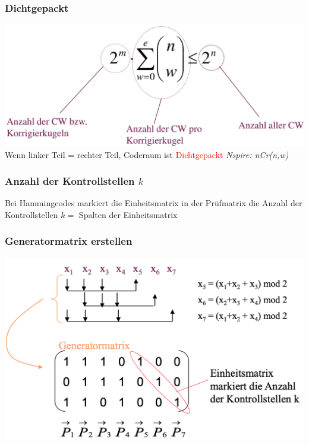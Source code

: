 \subsubsection{Dichtgepackt}
\includegraphics[width=\linewidth]{graphic/extern-reto/Dichtgepackt.png}\\
Wenn linker Teil = rechter Teil, Coderaum ist \textcolor{red}{Dichtgepackt}
\textit{Nspire: nCr(n,w)}

\subsubsection{Anzahl der Kontrollstellen $k$}
Bei Hammingcodes markiert die Einheitsmatrix in der Prüfmatrix die Anzahl der Kontrollstellen \colorbox{lightlightgrey}{$k = $ Spalten der Einheitsmatrix}

\subsubsection{Generatormatrix erstellen}
\begin{center}
    \includegraphics[width=\linewidth]{graphic/blockcode/generatormatrix.png}
\end{center}
\vspace{-8pt}



